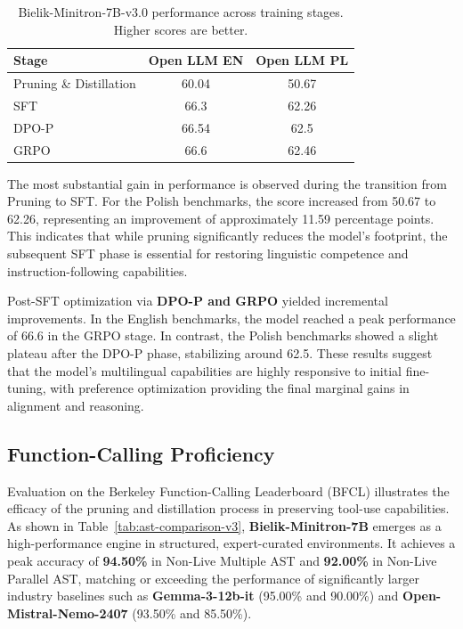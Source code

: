 \documentclass{article}
\begin{document}
\begin{table}[h]
    \centering
    \begin{tabular}{lcc}
        \toprule
        \textbf{Stage} & \textbf{Open LLM EN} & \textbf{Open LLM PL} \\
        \midrule
        Pruning \& Distillation & 60.04 & 50.67 \\
        SFT     & 66.3  & 62.26 \\
        DPO-P   & 66.54 & 62.5  \\
        GRPO    & 66.6  & 62.46 \\
        \bottomrule
    \end{tabular}
    \caption{Bielik-Minitron-7B-v3.0 performance across training stages. Higher scores are better.}
    \label{tab:performance}
\end{table}

The most substantial gain in performance is observed during the transition from Pruning to SFT. For the Polish benchmarks, the score increased from 50.67 to 62.26, representing an improvement of approximately 11.59 percentage points. This indicates that while pruning significantly reduces the model's footprint, the subsequent SFT phase is essential for restoring linguistic competence and instruction-following capabilities.

Post-SFT optimization via \textbf{DPO-P and GRPO} yielded incremental improvements. In the English benchmarks, the model reached a peak performance of 66.6 in the GRPO stage. In contrast, the Polish benchmarks showed a slight plateau after the DPO-P phase, stabilizing around 62.5. These results suggest that the model's multilingual capabilities are highly responsive to initial fine-tuning, with preference optimization providing the final marginal gains in alignment and reasoning.

\subsection{Function-Calling Proficiency}
Evaluation on the Berkeley Function-Calling Leaderboard (BFCL) \cite{patil2025bfcl} illustrates the efficacy of the pruning and distillation process in preserving tool-use capabilities. As shown in Table~\ref{tab:ast-comparison-v3}, \textbf{Bielik-Minitron-7B} emerges as a high-performance engine in structured, expert-curated environments. It achieves a peak accuracy of \textbf{94.50\%} in Non-Live Multiple AST and \textbf{92.00\%} in Non-Live Parallel AST, matching or exceeding the performance of significantly larger industry baselines such as \textbf{Gemma-3-12b-it} (95.00\% and 90.00\%) and \textbf{Open-Mistral-Nemo-2407} (93.50\% and 85.50\%).
\end{document}
